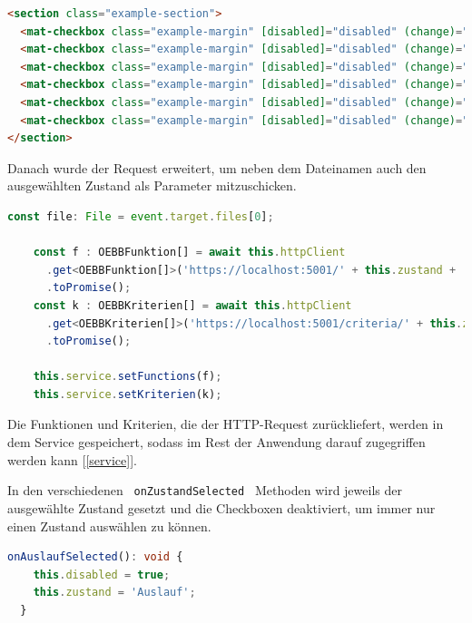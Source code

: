 \begin{lstlisting}[language=HTML, caption={Checkboxen zum Auswählen des Zustandes}]
<section class="example-section">
  <mat-checkbox class="example-margin" [disabled]="disabled" (change)="onAuslaufSelected()">Auslauf</mat-checkbox>&nbsp;&nbsp;
  <mat-checkbox class="example-margin" [disabled]="disabled" (change)="onAuslauf2Selected()">Auslauf 2</mat-checkbox>&nbsp;&nbsp;
  <mat-checkbox class="example-margin" [disabled]="disabled" (change)="onLagerSelected()">Lager</mat-checkbox>&nbsp;&nbsp;
  <mat-checkbox class="example-margin" [disabled]="disabled" (change)="onSchlagSelected()">Schlag</mat-checkbox>&nbsp;&nbsp;
  <mat-checkbox class="example-margin" [disabled]="disabled" (change)="onWarmSelected()">Warmlauf</mat-checkbox>&nbsp;&nbsp;
  <mat-checkbox class="example-margin" [disabled]="disabled" (change)="onWuchtSelected()">Wuchtlauf</mat-checkbox>
</section>
\end{lstlisting}

Danach wurde der Request erweitert, um neben dem Dateinamen auch den ausgewählten Zustand als Parameter mitzuschicken.

\begin{lstlisting}[language=Typescript, caption={Http-Request für Funktionen und Kriterien}]
    const file: File = event.target.files[0];

    const f : OEBBFunktion[] = await this.httpClient
      .get<OEBBFunktion[]>('https://localhost:5001/' + this.zustand + '/' + file.name)
      .toPromise();
    const k : OEBBKriterien[] = await this.httpClient
      .get<OEBBKriterien[]>('https://localhost:5001/criteria/' + this.zustand + '/' + file.name)
      .toPromise();

    this.service.setFunctions(f);
    this.service.setKriterien(k);
\end{lstlisting}

Die Funktionen und Kriterien, die der HTTP-Request zurückliefert, werden in dem Service gespeichert, sodass im Rest der Anwendung
darauf zugegriffen werden kann [\ref{service}].

In den verschiedenen \lstinline | onZustandSelected | Methoden wird jeweils der ausgewählte Zustand
gesetzt und die Checkboxen deaktiviert, um immer nur einen Zustand auswählen zu können.

\begin{lstlisting}[language=Typescript, caption={Eine der onZustandSelect-Methoden}]
    onAuslaufSelected(): void {
    this.disabled = true;
    this.zustand = 'Auslauf';
  }
\end{lstlisting}

